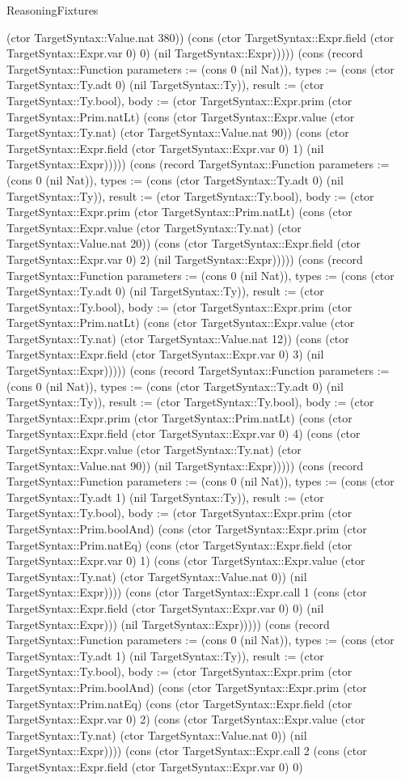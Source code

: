 \begin{lexlean}{ReasoningFixtures}
\begin{semanticmodule}
{(ctor TargetSyntax::Value.nat 380)) (cons (ctor TargetSyntax::Expr.field (ctor TargetSyntax::Expr.var 0) 0) (nil TargetSyntax::Expr))))}) (cons (record TargetSyntax::Function {parameters := (cons 0 (nil Nat)), types := (cons (ctor TargetSyntax::Ty.adt 0) (nil TargetSyntax::Ty)), result := (ctor TargetSyntax::Ty.bool), body := (ctor TargetSyntax::Expr.prim (ctor TargetSyntax::Prim.natLt) (cons (ctor TargetSyntax::Expr.value (ctor TargetSyntax::Ty.nat) (ctor TargetSyntax::Value.nat 90)) (cons (ctor TargetSyntax::Expr.field (ctor TargetSyntax::Expr.var 0) 1) (nil TargetSyntax::Expr))))}) (cons (record TargetSyntax::Function {parameters := (cons 0 (nil Nat)), types := (cons (ctor TargetSyntax::Ty.adt 0) (nil TargetSyntax::Ty)), result := (ctor TargetSyntax::Ty.bool), body := (ctor TargetSyntax::Expr.prim (ctor TargetSyntax::Prim.natLt) (cons (ctor TargetSyntax::Expr.value (ctor TargetSyntax::Ty.nat) (ctor TargetSyntax::Value.nat 20)) (cons (ctor TargetSyntax::Expr.field (ctor TargetSyntax::Expr.var 0) 2) (nil TargetSyntax::Expr))))}) (cons (record TargetSyntax::Function {parameters := (cons 0 (nil Nat)), types := (cons (ctor TargetSyntax::Ty.adt 0) (nil TargetSyntax::Ty)), result := (ctor TargetSyntax::Ty.bool), body := (ctor TargetSyntax::Expr.prim (ctor TargetSyntax::Prim.natLt) (cons (ctor TargetSyntax::Expr.value (ctor TargetSyntax::Ty.nat) (ctor TargetSyntax::Value.nat 12)) (cons (ctor TargetSyntax::Expr.field (ctor TargetSyntax::Expr.var 0) 3) (nil TargetSyntax::Expr))))}) (cons (record TargetSyntax::Function {parameters := (cons 0 (nil Nat)), types := (cons (ctor TargetSyntax::Ty.adt 0) (nil TargetSyntax::Ty)), result := (ctor TargetSyntax::Ty.bool), body := (ctor TargetSyntax::Expr.prim (ctor TargetSyntax::Prim.natLt) (cons (ctor TargetSyntax::Expr.field (ctor TargetSyntax::Expr.var 0) 4) (cons (ctor TargetSyntax::Expr.value (ctor TargetSyntax::Ty.nat) (ctor TargetSyntax::Value.nat 90)) (nil TargetSyntax::Expr))))}) (cons (record TargetSyntax::Function {parameters := (cons 0 (nil Nat)), types := (cons (ctor TargetSyntax::Ty.adt 1) (nil TargetSyntax::Ty)), result := (ctor TargetSyntax::Ty.bool), body := (ctor TargetSyntax::Expr.prim (ctor TargetSyntax::Prim.boolAnd) (cons (ctor TargetSyntax::Expr.prim (ctor TargetSyntax::Prim.natEq) (cons (ctor TargetSyntax::Expr.field (ctor TargetSyntax::Expr.var 0) 1) (cons (ctor TargetSyntax::Expr.value (ctor TargetSyntax::Ty.nat) (ctor TargetSyntax::Value.nat 0)) (nil TargetSyntax::Expr)))) (cons (ctor TargetSyntax::Expr.call 1 (cons (ctor TargetSyntax::Expr.field (ctor TargetSyntax::Expr.var 0) 0) (nil TargetSyntax::Expr))) (nil TargetSyntax::Expr))))}) (cons (record TargetSyntax::Function {parameters := (cons 0 (nil Nat)), types := (cons (ctor TargetSyntax::Ty.adt 1) (nil TargetSyntax::Ty)), result := (ctor TargetSyntax::Ty.bool), body := (ctor TargetSyntax::Expr.prim (ctor TargetSyntax::Prim.boolAnd) (cons (ctor TargetSyntax::Expr.prim (ctor TargetSyntax::Prim.natEq) (cons (ctor TargetSyntax::Expr.field (ctor TargetSyntax::Expr.var 0) 2) (cons (ctor TargetSyntax::Expr.value (ctor TargetSyntax::Ty.nat) (ctor TargetSyntax::Value.nat 0)) (nil TargetSyntax::Expr)))) (cons (ctor TargetSyntax::Expr.call 2 (cons (ctor TargetSyntax::Expr.field (ctor TargetSyntax::Expr.var 0) 0) }
\end{semanticmodule}
\end{lexlean}
